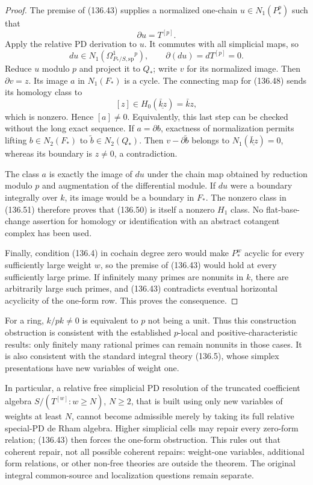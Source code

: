 \begin{proof}
The premise of (136.43) supplies a normalized
one-chain $u\in N_1(P_*^p)$ such that
\[
                            \partial u=T^{[p]}.
                                                               \tag{136.49}
\]
Apply the relative PD derivation to $u$.  It
commutes with all simplicial maps, so
\[
 du\in N_1(\Omega^1_{P_*/S,\mathrm{sp}}{}^{\!p}),
                 \qquad\partial(du)=dT^{[p]}=0.           \tag{136.50}
\]
Reduce $u$ modulo $p$ and project it to $Q_*$;
write $v$ for its normalized image.  Then
$\partial v=z$.  Its image $a$ in $N_1(F_*)$
is a cycle.  The connecting map for (136.48)
sends its homology class to
\[
                         [z]\in H_0(\underline{\bar k z})
                                      =\bar k z,
                                                               \tag{136.51}
\]
which is nonzero.  Hence $[a]\ne0$.
Equivalently, this last step can be checked
without the long exact sequence.  If $a=\partial b$,
exactness of normalization permits lifting
$b\in N_2(F_*)$ to $\widetilde b\in N_2(Q_*)$.
Then $v-\partial\widetilde b$ belongs to
$N_1(\underline{\bar k z})=0$, whereas its
boundary is $z\ne0$, a contradiction.

The class $a$ is exactly the image of $du$ under
the chain map obtained by reduction modulo $p$
and augmentation of the differential module.
If $du$ were a boundary integrally over $k$,
its image would be a boundary in $F_*$.  The
nonzero class in (136.51) therefore proves
that (136.50) is itself a nonzero $H_1$ class.
No flat-base-change assertion for homology or
identification with an abstract cotangent complex
has been used.

Finally, condition (136.4) in cochain degree zero
would make $P_*^w$ acyclic for every sufficiently
large weight $w$, so the premise of (136.43)
would hold at every sufficiently large prime.
If infinitely many primes are nonunits in $k$,
there are arbitrarily large such primes, and
(136.43) contradicts eventual horizontal acyclicity
of the one-form row.  This proves the consequence.
\end{proof}

For a ring, $k/pk\ne0$ is equivalent to $p$ not
being a unit.  Thus this construction obstruction
is consistent with the established $p$-local and
positive-characteristic results: only finitely
many rational primes can remain nonunits in
those cases.  It is also consistent with the
standard integral theory (136.5), whose simplex
presentations have new variables of weight one.

In particular, a relative free simplicial PD
resolution of the truncated coefficient algebra
$S/(T^{[w]}:w\geq N)$, $N\geq2$, that is built
using only new variables of weights at least
$N$, cannot become admissible merely by taking
its full relative special-PD de Rham algebra.
Higher simplicial cells may repair every
zero-form relation; (136.43) then forces the
one-form obstruction.  This rules out that
coherent repair, not all possible coherent
repairs: weight-one variables, additional form
relations, or other non-free theories are
outside the theorem.  The original integral
common-source and localization questions remain
separate.


